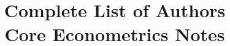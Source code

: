 \documentclass[nohyper]{external/tufte-handout}
\title[Complete list of authors]%
{Complete List of Authors \\
  Core Econometrics Notes}
\begin{document}
\maketitle
\bigskip

\end{document}
